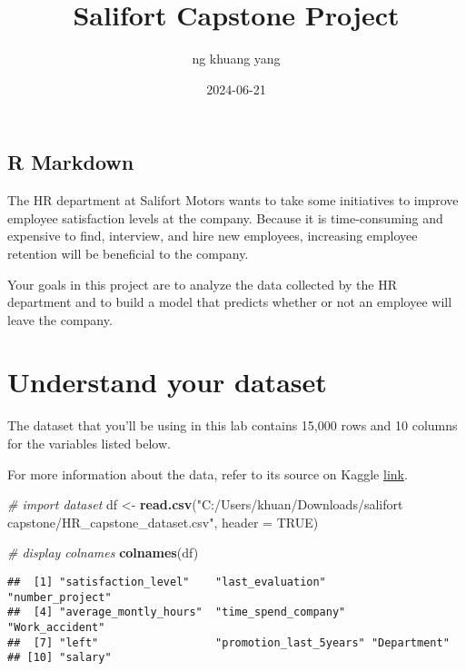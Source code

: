 \documentclass[
]{article}
\title{Salifort Capstone Project}
\author{ng khuang yang}
\date{2024-06-21}
\newenvironment{Shaded}{\begin{snugshade}}{\end{snugshade}}
\newcommand{\AttributeTok}[1]{\textcolor[rgb]{0.13,0.29,0.53}{#1}}
\newcommand{\CommentTok}[1]{\textcolor[rgb]{0.56,0.35,0.01}{\textit{#1}}}
\newcommand{\ConstantTok}[1]{\textcolor[rgb]{0.56,0.35,0.01}{#1}}
\newcommand{\FunctionTok}[1]{\textcolor[rgb]{0.13,0.29,0.53}{\textbf{#1}}}
\newcommand{\NormalTok}[1]{#1}
\newcommand{\OtherTok}[1]{\textcolor[rgb]{0.56,0.35,0.01}{#1}}
\newcommand{\StringTok}[1]{\textcolor[rgb]{0.31,0.60,0.02}{#1}}
\begin{document}
\maketitle

\subsection{R Markdown}\label{r-markdown}

The HR department at Salifort Motors wants to take some initiatives to
improve employee satisfaction levels at the company. Because it is
time-consuming and expensive to find, interview, and hire new employees,
increasing employee retention will be beneficial to the company.

Your goals in this project are to analyze the data collected by the HR
department and to build a model that predicts whether or not an employee
will leave the company.

\section{Understand your dataset}\label{understand-your-dataset}

The dataset that you'll be using in this lab contains 15,000 rows and 10
columns for the variables listed below.

For more information about the data, refer to its source on Kaggle
\href{https://www.kaggle.com/datasets/mfaisalqureshi/hr-analytics-and-job-prediction?select=HR_comma_sep.csv}{link}.

\begin{Shaded}
\begin{Highlighting}[]
\CommentTok{\# import dataset}
\NormalTok{df }\OtherTok{\textless{}{-}} \FunctionTok{read.csv}\NormalTok{(}\StringTok{"C:/Users/khuan/Downloads/salifort capstone/HR\_capstone\_dataset.csv"}\NormalTok{, }\AttributeTok{header =} \ConstantTok{TRUE}\NormalTok{)}
\end{Highlighting}
\end{Shaded}

\begin{Shaded}
\begin{Highlighting}[]
\CommentTok{\# display colnames}
\FunctionTok{colnames}\NormalTok{(df)}
\end{Highlighting}
\end{Shaded}

\begin{verbatim}
##  [1] "satisfaction_level"    "last_evaluation"       "number_project"       
##  [4] "average_montly_hours"  "time_spend_company"    "Work_accident"        
##  [7] "left"                  "promotion_last_5years" "Department"           
## [10] "salary"
\end{verbatim}
\end{document}
